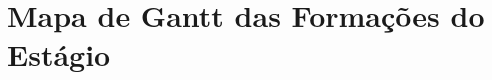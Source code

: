 \section{Mapa de Gantt das Formações do Estágio}\label{anexo_formacoes}

\renewcommand*{\thepage}{B\arabic{page}}

\begin{figure}[htbp]
    \centering

    \def\pgfcalendarweekdayletter#1{%
      \ifcase#1\tiny{M}\or \tiny{T}\or \tiny{W}\or \tiny{T}\or \tiny{F}\or \tiny{S}\or \tiny{S}\fi%
    }

    


\end{figure}
